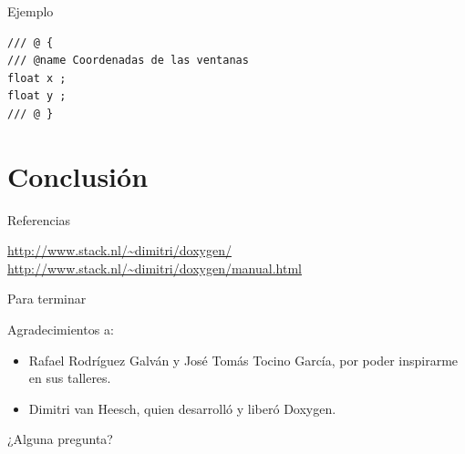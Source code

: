\documentclass[12pt,xcolor=svgnames]{beamer}
\begin{document}
\begin{frame}[fragile]{Ejemplo}
  \begin{verbatim}
/// @ {
/// @name Coordenadas de las ventanas
float x ;
float y ;
/// @ }
\end{verbatim}
\end{frame}

\section{Conclusión}

\begin{frame}{Referencias}
  \scriptsize
  \begin{thebibliography}{6}
  \bibitem{} \url{http://www.stack.nl/~dimitri/doxygen/}
  \bibitem{} \url{http://www.stack.nl/~dimitri/doxygen/manual.html}
  \end{thebibliography}
\end{frame}

\begin{frame}{Para terminar}

  Agradecimientos a:
  \begin{itemize}
  \item Rafael Rodríguez Galván y José Tomás Tocino García, por poder
    inspirarme en sus talleres.
  \item Dimitri van Heesch, quien desarrolló y liberó Doxygen.
  \end{itemize}
  \vspace*{1cm}
  \begin{center}
    {\Large ¿Alguna pregunta?}
  \end{center}
\end{frame}

\licencia
\end{document}
